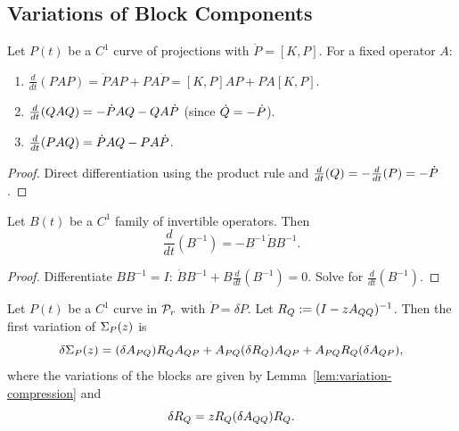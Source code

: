 \subsection{Variations of Block Components}
\label{subsec:block-variations}

\begin{lemma}
\label{lem:variation-compression}
Let $P(t)$ be a $C^1$ curve of projections with $\dot{P} = [K, P]$.
For a fixed operator $A$:
\begin{enumerate}[label=(\roman*)]
\item $\frac{d}{dt}(PAP) = \dot{P} A P + P A \dot{P} = [K, P] A P + P A [K, P]$.
\item $\frac{d}{dt}(Q A Q) = -\dot{P} A Q - Q A \dot{P}$ (since $\dot{Q} = -\dot{P}$).
\item $\frac{d}{dt}(P A Q) = \dot{P} A Q - P A \dot{P}$.
\end{enumerate}
\end{lemma}

\begin{proof}
Direct differentiation using the product rule and $\frac{d}{dt}(Q) = -\frac{d}{dt}(P) = -\dot{P}$.
\end{proof}

\begin{lemma}
\label{lem:variation-inverse}
Let $B(t)$ be a $C^1$ family of invertible operators.
Then
\[
\frac{d}{dt}(B^{-1}) = -B^{-1} \dot{B} B^{-1}.
\]
\end{lemma}

\begin{proof}
Differentiate $B B^{-1} = I$: $\dot{B} B^{-1} + B \frac{d}{dt}(B^{-1}) = 0$.
Solve for $\frac{d}{dt}(B^{-1})$.
\end{proof}

\begin{proposition}
\label{prop:variation-sigma}
Let $P(t)$ be a $C^1$ curve in $\mathcal{P}_{r}$ with $\dot{P} = \delta P$.
Let $R_Q := (I - zA_{QQ})^{-1}$.
Then the first variation of $\Sigma_{P}(z)$ is
\[
\delta \Sigma_{P}(z)
= (\delta A_{PQ}) R_Q A_{QP}
+ A_{PQ} (\delta R_Q) A_{QP}
+ A_{PQ} R_Q (\delta A_{QP}),
\]
where the variations of the blocks are given by Lemma~\ref{lem:variation-compression} and
\[
\delta R_Q = z R_Q (\delta A_{QQ}) R_Q.
\]
\end{proposition}

